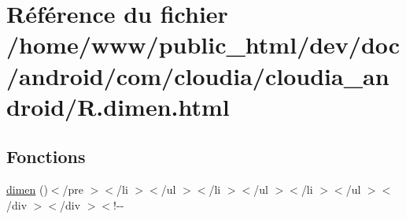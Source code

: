 \hypertarget{_r_8dimen_8html}{\section{Référence du fichier /home/www/public\-\_\-html/dev/doc/android/com/cloudia/cloudia\-\_\-android/\-R.dimen.\-html}
\label{_r_8dimen_8html}
}
\subsection*{Fonctions}
\begin{DoxyCompactItemize}
\item 
\hyperlink{_r_8dimen_8html_adc2efb7b3dd1fbcdfb34a211a7a79fcb}{dimen} ()$<$/pre $>$$<$/li $>$$<$/ul $>$$<$/li $>$$<$/ul $>$$<$/li $>$$<$/ul $>$$<$/div $>$$<$/div $>$$<$!-\/-\/
\end{DoxyCompactItemize}

